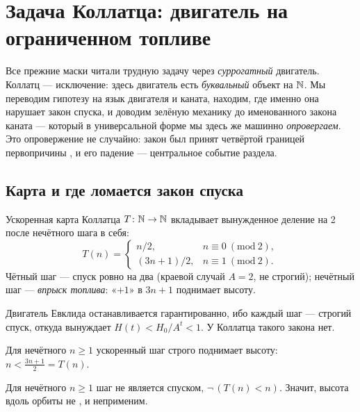 \section{Задача Коллатца: двигатель на ограниченном топливе}\label{sec:collatz}

Все прежние маски читали трудную задачу через \emph{суррогатный} двигатель. Коллатц --- исключение:
здесь двигатель есть \emph{буквальный} объект на $\mathbb{N}$. Мы переводим гипотезу на язык двигателя и
каната, находим, где именно она нарушает закон спуска, и доводим зелёную механику до именованного
закона каната --- который в универсальной форме мы здесь же машинно \emph{опровергаем}. Это
опровержение не случайно: закон был принят четвёртой границей первопричины \axiom{}, и его падение ---
центральное событие раздела.

\subsection{Карта и где ломается закон спуска}

\begin{definition}\label{def:collatzMap}
Ускоренная карта Коллатца $T\colon\mathbb{N}\to\mathbb{N}$ вкладывает вынужденное деление на 2 после нечётного шага в
себя:
\begin{equation}\label{eq:collatz-map}
T(n)=\begin{cases}n/2,& n\equiv 0\ (\mathrm{mod}\ 2),\\[2pt] (3n+1)/2,& n\equiv 1\ (\mathrm{mod}\ 2).\end{cases}
\end{equation}
Чётный шаг --- спуск ровно на два (краевой случай $A=2$, не строгий); нечётный шаг --- \emph{впрыск
топлива}: «$+1$» в $3n+1$ поднимает высоту.
\end{definition}

Двигатель Евклида останавливается гарантированно, ибо каждый шаг --- строгий спуск, откуда
 вынуждает $H(t)<H_0/A^{t}<1$. У Коллатца такого закона нет.

\begin{theorem}\label{thm:odd_accel_ascends}
Для нечётного $n\ge 1$ ускоренный шаг строго поднимает высоту: $n<\tfrac{3n+1}{2}=T(n)$. \green{}
\end{theorem}

\begin{theorem}\label{thm:not_descent_on_odd}
Для нечётного $n\ge 1$ шаг не является спуском, $\neg\,(T(n)<n)$. Значит, высота вдоль орбиты не
, и  неприменим. \green{}
\end{theorem}

